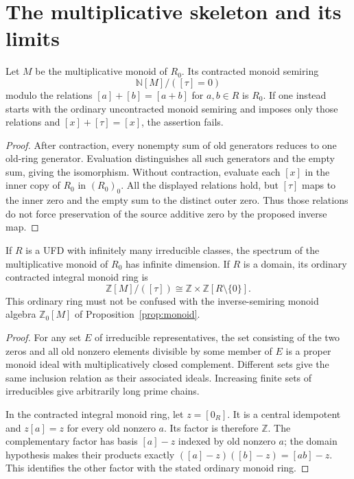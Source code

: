 \section{The multiplicative skeleton and its limits}
\label{sec:multiplicativeskeleton}
\begin{proposition}\label{prop:contracted-presentation}
Let $M$ be the multiplicative monoid of $R_0$. Its contracted monoid semiring
\[
 \mathbb N[M]/([\tau]=0)
\]
modulo the relations $[a]+[b]=[a+b]$ for $a,b\in R$ is $R_0$.
If one instead starts with the ordinary uncontracted monoid semiring and
imposes only those relations and $[x]+[\tau]=[x]$, the assertion fails.
\end{proposition}
\begin{proof}
After contraction, every nonempty sum of old generators reduces to one
old-ring generator. Evaluation distinguishes all such generators and the
empty sum, giving the isomorphism. Without contraction, evaluate each
$[x]$ in the inner copy of $R_0$ in $(R_0)_0$. All the displayed relations
hold, but $[\tau]$ maps to the inner zero and the empty sum to the distinct
outer zero. Thus those relations do not force preservation of the source
additive zero by the proposed inverse map.
\end{proof}

\begin{proposition}\label{prop:monoid-spectrum-ring}
If $R$ is a UFD with infinitely many irreducible classes, the spectrum of
the multiplicative monoid of $R_0$ has infinite dimension. If $R$ is a
domain, its ordinary contracted integral monoid ring is
\[
 \mathbb Z[M]/([\tau])\cong\mathbb Z\times\mathbb Z[R\setminus\{0\}].
\]
This ordinary ring must not be confused with the inverse-semiring monoid
algebra $\mathbb Z_0[M]$ of Proposition~\ref{prop:monoid}.
\end{proposition}
\begin{proof}
For any set $E$ of irreducible representatives, the set consisting of the
two zeros and all old nonzero elements divisible by some member of $E$
is a proper monoid ideal with multiplicatively closed complement.
Different sets give the same inclusion relation as their associated
ideals. Increasing finite sets of irreducibles give arbitrarily long
prime chains.

In the contracted integral monoid ring, let $z=[0_R]$. It is a central
idempotent and $z[a]=z$ for every old nonzero $a$. Its factor is therefore
$\mathbb Z$. The complementary factor has basis $[a]-z$ indexed by old
nonzero $a$; the domain hypothesis makes their products exactly
$([a]-z)([b]-z)=[ab]-z$. This identifies the other factor with the stated
ordinary monoid ring.
\end{proof}

